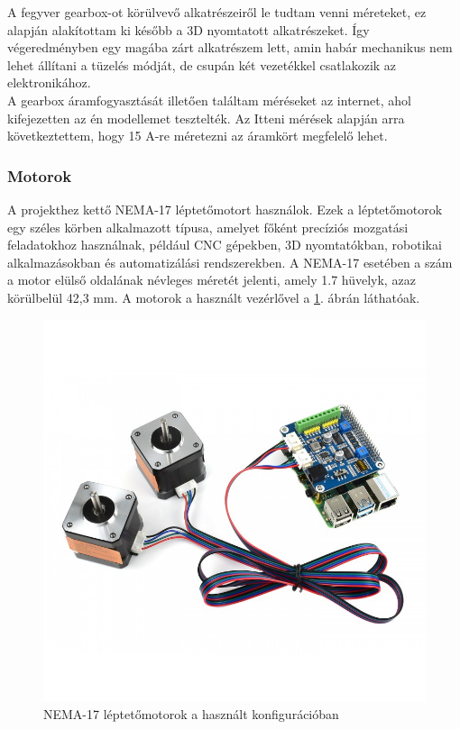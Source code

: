 \documentclass[12pt,a4paper]{article}
\begin{document}
A fegyver gearbox-ot körülvevő alkatrészeiről le tudtam venni méreteket, ez alapján alakítottam ki később a 3D nyomtatott alkatrészeket. Így végeredményben egy magába zárt alkatrészem lett, amin habár mechanikus nem lehet állítani a tüzelés módját, de csupán két vezetékkel csatlakozik az elektronikához. \\

A gearbox áramfogyasztását illetően találtam méréseket az internet, ahol kifejezetten az én modellemet tesztelték. Az Itteni mérések alapján arra következtettem, hogy 15 A-re méretezni az áramkört megfelelő lehet. \cite{aisroftteszt}

\subsubsection*{Motorok}

A projekthez kettő NEMA-17 léptetőmotort használok\cite{nema17}. Ezek a léptetőmotorok egy széles körben alkalmazott típusa, amelyet főként precíziós mozgatási feladatokhoz használnak, például CNC gépekben, 3D nyomtatókban, robotikai alkalmazásokban és automatizálási rendszerekben. A NEMA-17 esetében a szám a motor elülső oldalának névleges méretét jelenti, amely 1.7 hüvelyk, azaz körülbelül 42,3 mm. A motorok a használt vezérlővel a \ref{fig:mech_stepper}. ábrán láthatóak.\\

\begin{figure}[h!]
	\centering
	\includegraphics[width=1\linewidth]{mech_stepper}
	\caption{NEMA-17 léptetőmotorok a használt konfigurációban}
	\label{fig:mech_stepper}
\end{figure}
\end{document}
